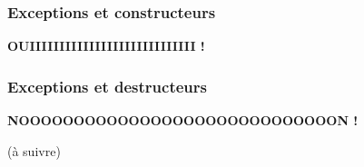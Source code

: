 \documentclass{beamer}
\begin{document}
\begin{frame}[fragile=singleslide,shrink=20]
\frametitle {Exceptions et constructeurs}

\begin{centering}
\textbf{OUIIIIIIIIIIIIIIIIIIIIIIIIIIII !}
\end{centering}

\end{frame}

\begin{frame}[fragile=singleslide,shrink=20]
\frametitle {Exceptions et destructeurs}

\begin{centering}
\textbf{NOOOOOOOOOOOOOOOOOOOOOOOOOOOOON !}
\end{centering}

\end{frame}

\begin{frame}
(à suivre)
\end{frame}
\end{document}
